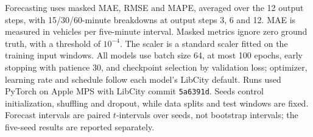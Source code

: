 Forecasting uses masked MAE, RMSE and MAPE, averaged over the 12 output steps,
with 15/30/60-minute breakdowns at output steps 3, 6 and 12. MAE is measured in
vehicles per five-minute interval. Masked metrics ignore zero ground truth, with
a threshold of $10^{-4}$. The scaler is a standard scaler fitted on the training
input windows. All models use batch size 64, at most 100 epochs, early stopping
with patience 30, and checkpoint selection by validation loss; optimizer,
learning rate and schedule follow each model's LibCity default. Runs used
PyTorch on Apple MPS with LibCity commit \texttt{5a6391d}. Seeds control
initialization, shuffling and dropout, while data splits and test windows are
fixed. Forecast intervals are paired $t$-intervals over seeds, not bootstrap
intervals; the five-seed results are reported separately.

